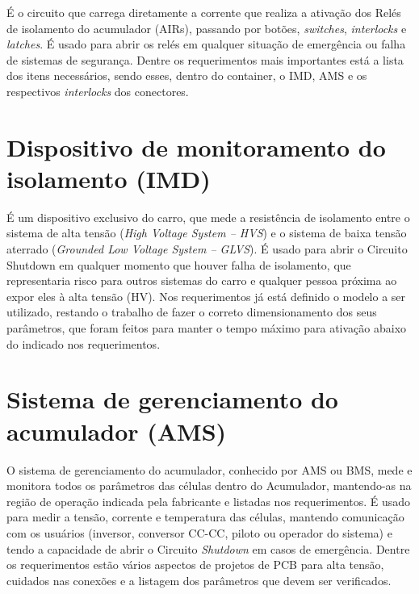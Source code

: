     É o circuito que carrega diretamente a corrente que realiza a ativação dos Relés de isolamento do acumulador (AIRs), passando por botões, \textit{switches}, \textit{interlocks} e \textit{latches}. É usado para abrir os relés em qualquer situação de emergência ou falha de sistemas de segurança. Dentre os requerimentos mais importantes está a lista dos itens necessários, sendo esses, dentro do container, o IMD, AMS e os respectivos \textit{interlocks} dos conectores.


\section{Dispositivo de monitoramento do isolamento (IMD)}

    É um dispositivo exclusivo do carro, que mede a resistência de isolamento entre o sistema de alta tensão (\textit{High Voltage System – HVS}) e o sistema de baixa tensão aterrado (\textit{Grounded Low Voltage System – GLVS}). É usado para abrir o Circuito Shutdown em qualquer momento que houver falha de isolamento, que representaria risco para outros sistemas do carro e qualquer pessoa próxima ao expor eles à alta tensão (HV). Nos requerimentos já está definido o modelo a ser utilizado, restando o trabalho de fazer o correto dimensionamento dos seus parâmetros, que foram feitos para manter o tempo máximo para ativação abaixo do indicado nos requerimentos.


\section{Sistema de gerenciamento do acumulador (AMS)}

    O sistema de gerenciamento do acumulador, conhecido por AMS ou BMS, mede e monitora todos os parâmetros das células dentro do Acumulador, mantendo-as na região de operação indicada pela fabricante e listadas nos requerimentos. É usado para medir a tensão, corrente e temperatura das células, mantendo comunicação com os usuários (inversor, conversor CC-CC, piloto ou operador do sistema) e tendo a capacidade de abrir o Circuito \textit{Shutdown} em casos de emergência. Dentre os requerimentos estão vários aspectos de projetos de PCB para alta tensão, cuidados nas conexões e a listagem dos parâmetros que devem ser verificados.

